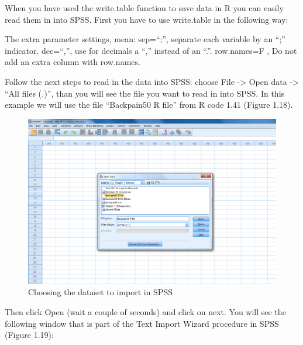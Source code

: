 \documentclass[]{book}
\begin{document}
When you have used the write.table function to save data in R you can
easily read them in into SPSS. First you have to use write.table in the
following way:

The extra parameter settings, mean: sep=``;'', separate each variable by
an ``;'' indicator. dec=``,'', use for decimals a ``,'' instead of an
``.''. row.names=F , Do not add an extra column with row.names.

Follow the next steps to read in the data into SPSS: choose File
-\textgreater{} Open data -\textgreater{} ``All files (\emph{.})'', than
you will see the file you want to read in into SPSS. In this example we
will use the file ``Backpain50 R file'' from R code 1.41 (Figure 1.18).

\begin{figure}

{\centering \includegraphics[width=0.9\linewidth]{images/fig1.18} 

}

\caption{Choosing the dataset to import in SPSS}\label{fig:fig18}
\end{figure}

Then click Open (wait a couple of seconds) and click on next. You will
see the following window that is part of the Text Import Wizard
procedure in SPSS (Figure 1.19):
\end{document}
